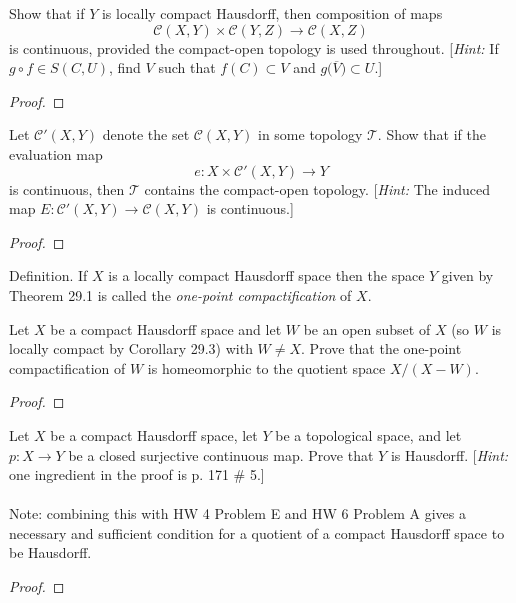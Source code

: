 \newpage
\begin{problem}[Munkres \S 46, Ex.\,7]
Show that if $Y$ is locally compact Hausdorff, then composition
of maps
\[\mathcal{C}(X,Y)\times\mathcal{C}(Y,Z)\longrightarrow\mathcal{C}(X,Z)\]
is continuous, provided the compact-open topology is used
throughout. [\emph{Hint:} If $g\circ f\in S(C,U)$, find $V$ such
that $f(C)\subset V$ and $g\bigl(\overline{V}\bigr)\subset U$.]
\end{problem}
\begin{proof}
\end{proof}
\newpage
\begin{problem}[Munkres \S 46, Ex.\,8]
Let $\mathcal{C}'(X,Y)$ denote the set $\mathcal{C}(X,Y)$ in some
topology $\mathcal{T}$. Show that if the evaluation map
\[
e\colon X\times\mathcal{C}'(X,Y)\longrightarrow Y
\]
is continuous, then $\mathcal{T}$ contains the compact-open
topology. [\emph{Hint:} The induced map
$E\colon\mathcal{C}'(X,Y)\to\mathcal{C}(X,Y)$ is continuous.]
\end{problem}
\begin{proof}
\end{proof}
\newpage
\begin{problem}[(A)]
\begin{definition}
Definition. If $X$ is a locally compact Hausdorff space then the
space $Y$ given by Theorem 29.1 is called the \emph{one-point
  compactification} of $X$.
\end{definition}

Let $X$ be a compact Hausdorff space and let $W$ be an open
subset of $X$ (so $W$ is locally compact by Corollary 29.3) with
$W\neq X$. Prove that the one-point compactification of $W$ is
homeomorphic to the quotient space $X/(X-W)$.
\end{problem}
\begin{proof}
\end{proof}
\newpage
\begin{problem}[(B)]
Let $X$ be a compact Hausdorff space, let $Y$ be a topological
space, and let $p\colon X\to Y$ be a closed surjective continuous
map. Prove that $Y$ is Hausdorff. [\emph{Hint:} one ingredient in the
proof is p. 171 \# 5.]
\\\\
Note: combining this with HW 4 Problem E and HW 6 Problem A gives
a necessary and sufficient condition for a quotient of a compact
Hausdorff space to be Hausdorff.
\end{problem}
\begin{proof}
\end{proof}
